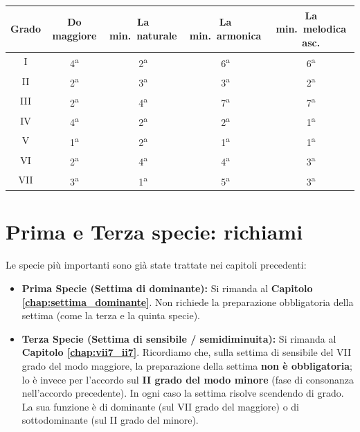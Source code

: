 \begin{center}
\begin{tabular}{|c|c|c|c|c|}
\hline
Grado & Do maggiore & La min.\ naturale & La min.\ armonica & La min.\ melodica asc. \\
\hline
I & 4\textsuperscript{a} & 2\textsuperscript{a} & 6\textsuperscript{a} & 6\textsuperscript{a} \\
II & 2\textsuperscript{a} & 3\textsuperscript{a} & 3\textsuperscript{a} & 2\textsuperscript{a} \\
III & 2\textsuperscript{a} & 4\textsuperscript{a} & 7\textsuperscript{a} & 7\textsuperscript{a} \\
IV & 4\textsuperscript{a} & 2\textsuperscript{a} & 2\textsuperscript{a} & 1\textsuperscript{a} \\
V & 1\textsuperscript{a} & 2\textsuperscript{a} & 1\textsuperscript{a} & 1\textsuperscript{a} \\
VI & 2\textsuperscript{a} & 4\textsuperscript{a} & 4\textsuperscript{a} & 3\textsuperscript{a} \\
VII & 3\textsuperscript{a} & 1\textsuperscript{a} & 5\textsuperscript{a} & 3\textsuperscript{a} \\
\hline
\end{tabular}
\end{center}

\section{Prima e Terza specie: richiami}
\label{sec:richiami_specie}

Le specie più importanti sono già state trattate nei capitoli precedenti:

\begin{itemize}
    \item \textbf{Prima Specie (Settima di dominante):} Si rimanda al \textbf{Capitolo \ref{chap:settima_dominante}}. Non richiede la preparazione obbligatoria della settima (come la terza e la quinta specie).
    \item \textbf{Terza Specie (Settima di sensibile / semidiminuita):} Si rimanda al \textbf{Capitolo \ref{chap:vii7_ii7}}. Ricordiamo che, sulla settima di sensibile del VII grado del modo maggiore, la preparazione della settima \textbf{non è obbligatoria}; lo è invece per l'accordo sul \textbf{II grado del modo minore} (fase di consonanza nell'accordo precedente). In ogni caso la settima risolve scendendo di grado. La sua funzione è di dominante (sul VII grado del maggiore) o di sottodominante (sul II grado del minore).
\end{itemize}

